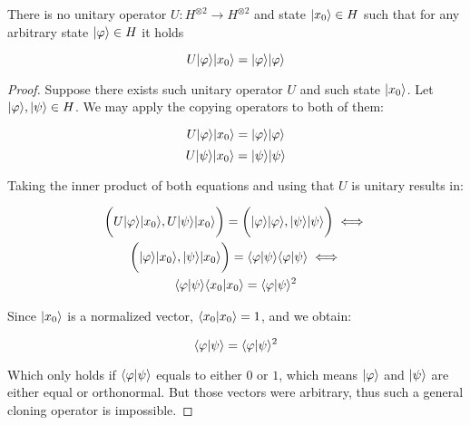 \begin{theorem}
\label{no-cloning-theorem}
	There is no unitary operator $U: H^{\otimes 2} \longrightarrow H^{\otimes 2}$ and state $|x_0\rangle \in H$ such that for any arbitrary state $|\varphi\rangle \in H$ it holds
	
	$$ U |\varphi\rangle |x_0\rangle = |\varphi\rangle |\varphi\rangle $$
\end{theorem}
\begin{proof}
	Suppose there exists such unitary operator $U$ and such state $|x_0\rangle$. Let $|\varphi\rangle, |\psi\rangle \in H$. We may apply the copying operators to both of them:
	
	$$ U |\varphi\rangle |x_0\rangle = |\varphi\rangle |\varphi\rangle $$
	$$ U |\psi\rangle |x_0\rangle = |\psi\rangle |\psi\rangle $$
	
	Taking the inner product of both equations and using that $U$ is unitary results in:
	
	\begin{equation*}
		\begin{gathered}
			\bigg( U |\varphi\rangle |x_0\rangle, U |\psi\rangle |x_0\rangle \bigg) = \bigg( |\varphi\rangle |\varphi\rangle, |\psi\rangle |\psi\rangle \bigg) \iff \\
			\bigg( |\varphi\rangle |x_0\rangle, |\psi\rangle |x_0\rangle \bigg) = \langle\varphi|\psi\rangle \langle\varphi|\psi\rangle \iff \\
			\langle\varphi|\psi\rangle \langle x_0|x_0 \rangle = \langle\varphi|\psi\rangle^2
		\end{gathered}
	\end{equation*}
	
	Since $|x_0\rangle$ is a normalized vector, $\langle x_0|x_0 \rangle = 1$, and we obtain:
	
	$$\langle\varphi|\psi\rangle = \langle\varphi|\psi\rangle^2$$
	
	Which only holds if $\langle\varphi|\psi\rangle$ equals to either $0$ or $1$, which means $|\varphi\rangle$ and $|\psi\rangle$ are either equal or orthonormal. But those vectors were arbitrary, thus such a general cloning operator is impossible. 
\end{proof}
